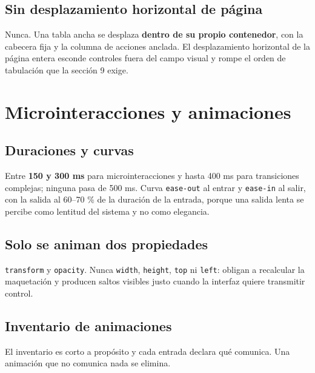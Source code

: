 \subsection{Sin desplazamiento horizontal de página}

Nunca. Una tabla ancha se desplaza \textbf{dentro de su propio contenedor}, con la cabecera fija y la columna de acciones anclada. El desplazamiento horizontal de la página entera esconde controles fuera del campo visual y rompe el orden de tabulación que la sección 9 exige.

\section{Microinteracciones y animaciones}

\subsection{Duraciones y curvas}

Entre \textbf{150 y 300 ms} para microinteracciones y hasta 400 ms para transiciones complejas; ninguna pasa de 500 ms. Curva \texttt{ease-out} al entrar y \texttt{ease-in} al salir, con la salida al 60--70 \% de la duración de la entrada, porque una salida lenta se percibe como lentitud del sistema y no como elegancia.

\subsection{Solo se animan dos propiedades}

\texttt{transform} y \texttt{opacity}. Nunca \texttt{width}, \texttt{height}, \texttt{top} ni \texttt{left}: obligan a recalcular la maquetación y producen saltos visibles justo cuando la interfaz quiere transmitir control.

\subsection{Inventario de animaciones}

El inventario es corto a propósito y cada entrada declara qué comunica. Una animación que no comunica nada se elimina.

